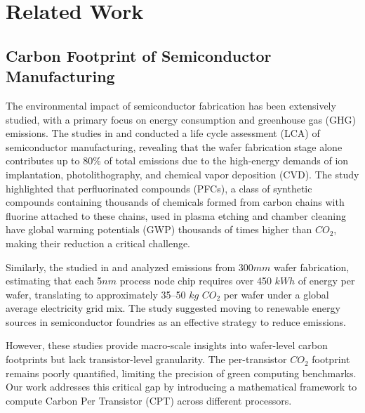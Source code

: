 \section{Related Work}
\subsection{Carbon Footprint of Semiconductor Manufacturing}
The environmental impact of semiconductor fabrication has been extensively studied, with a primary focus on energy consumption and greenhouse gas (GHG) emissions. The studies in\cite{huang2016developing} and \cite{vasan2014carbon} conducted a life cycle assessment (LCA) of semiconductor manufacturing, revealing that the wafer fabrication stage alone contributes up to 80\% of total emissions due to the high-energy demands of ion implantation, photolithography, and chemical vapor deposition (CVD). The study highlighted that perfluorinated compounds (PFCs), a class of synthetic compounds containing thousands of chemicals formed from carbon chains with fluorine attached to these chains, used in plasma etching and chamber cleaning have global warming potentials (GWP) thousands of times higher than $CO_2$, making their reduction a critical challenge.

Similarly, the studied in \cite{huang2016developing} and \cite{boyd2011life} analyzed emissions from 300$mm$ wafer fabrication, estimating that each 5$nm$ process node chip requires over 450 $kWh$ of energy per wafer, translating to approximately 35–50 $kg$ $CO_2$ per wafer under a global average electricity grid mix. The study suggested moving to renewable energy sources in semiconductor foundries as an effective strategy to reduce emissions.

However, these studies provide macro-scale insights into wafer-level carbon footprints but lack transistor-level granularity. The per-transistor $CO_2$ footprint remains poorly quantified, limiting the precision of green computing benchmarks. Our work addresses this critical gap by introducing a mathematical framework to compute Carbon Per Transistor (CPT) across different processors.

